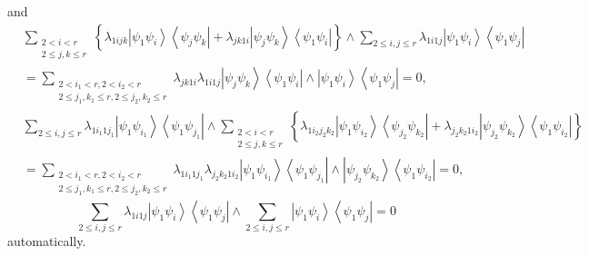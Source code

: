\documentclass[aps,preprint]{revtex4}%
\begin{document}
\begin{itemize}
and%
\begin{align}
&  \sum_{\substack{2<i<r\\2\leq j,k\leq r}}\left\{  \lambda_{1ijk}\left\vert
\psi_{1}\psi_{i}\right\rangle \left\langle \psi_{j}\psi_{k}\right\vert
+\lambda_{jk1i}\left\vert \psi_{j}\psi_{k}\right\rangle \left\langle \psi
_{1}\psi_{i}\right\vert \right\}  \wedge\sum_{2\leq i,j\leq r}\lambda
_{1i1j}\left\vert \psi_{1}\psi_{i}\right\rangle \left\langle \psi_{1}\psi
_{j}\right\vert \nonumber\\
&  =\sum_{\substack{2<i_{1}<r,2<i_{2}<r\\2\leq j_{1},k_{1}\leq r,2\leq
j_{2},k_{2}\leq r}}\lambda_{jk1i}\lambda_{1i1j}\left\vert \psi_{j}\psi
_{k}\right\rangle \left\langle \psi_{1}\psi_{i}\right\vert \wedge\left\vert
\psi_{1}\psi_{i}\right\rangle \left\langle \psi_{1}\psi_{j}\right\vert =0,
\end{align}%
\begin{align}
&  \sum_{2\leq i,j\leq r}\lambda_{1i_{1}1j_{1}}\left\vert \psi_{1}\psi_{i_{1}%
}\right\rangle \left\langle \psi_{1}\psi_{j_{1}}\right\vert \wedge
\sum_{\substack{2<i<r\\2\leq j,k\leq r}}\left\{  \lambda_{1i_{2}j_{2}k_{2}%
}\left\vert \psi_{1}\psi_{i_{2}}\right\rangle \left\langle \psi_{j_{2}}%
\psi_{k_{2}}\right\vert +\lambda_{j_{2}k_{2}1i_{2}}\left\vert \psi_{j_{2}}%
\psi_{k_{2}}\right\rangle \left\langle \psi_{1}\psi_{i_{2}}\right\vert
\right\} \\
&  =\sum_{\substack{2<i_{1}<r,2<i_{2}<r\\2\leq j_{1},k_{1}\leq r,2\leq
j_{2},k_{2}\leq r}}\lambda_{1i_{1}1j_{1}}\lambda_{j_{2}k_{2}1i_{2}}\left\vert
\psi_{1}\psi_{i_{1}}\right\rangle \left\langle \psi_{1}\psi_{j_{1}}\right\vert
\wedge\left\vert \psi_{j_{2}}\psi_{k_{2}}\right\rangle \left\langle \psi
_{1}\psi_{i_{2}}\right\vert =0,
\end{align}%
\begin{equation}
\sum_{2\leq i,j\leq r}\lambda_{1i1j}\left\vert \psi_{1}\psi_{i}\right\rangle
\left\langle \psi_{1}\psi_{j}\right\vert \wedge\sum_{2\leq i,j\leq
r}\left\vert \psi_{1}\psi_{i}\right\rangle \left\langle \psi_{1}\psi
_{j}\right\vert =0
\end{equation}
automatically.


\end{itemize}
\end{document}
